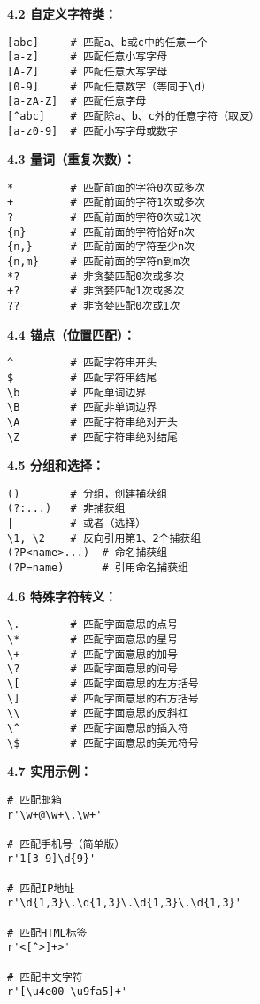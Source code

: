 \begin{mdframed}[linewidth=1pt, linecolor=black]
  \textbf{4.2 自定义字符类：}
  \begin{lstlisting}
[abc]     # 匹配a、b或c中的任意一个
[a-z]     # 匹配任意小写字母
[A-Z]     # 匹配任意大写字母
[0-9]     # 匹配任意数字（等同于\d）
[a-zA-Z]  # 匹配任意字母
[^abc]    # 匹配除a、b、c外的任意字符（取反）
[a-z0-9]  # 匹配小写字母或数字
  \end{lstlisting}

  \textbf{4.3 量词（重复次数）：}
  \begin{lstlisting}
*         # 匹配前面的字符0次或多次
+         # 匹配前面的字符1次或多次
?         # 匹配前面的字符0次或1次
{n}       # 匹配前面的字符恰好n次
{n,}      # 匹配前面的字符至少n次
{n,m}     # 匹配前面的字符n到m次
*?        # 非贪婪匹配0次或多次
+?        # 非贪婪匹配1次或多次
??        # 非贪婪匹配0次或1次
  \end{lstlisting}

  \textbf{4.4 锚点（位置匹配）：}
  \begin{lstlisting}
^         # 匹配字符串开头
$         # 匹配字符串结尾
\b        # 匹配单词边界
\B        # 匹配非单词边界
\A        # 匹配字符串绝对开头
\Z        # 匹配字符串绝对结尾
  \end{lstlisting}

  \textbf{4.5 分组和选择：}
  \begin{lstlisting}
()        # 分组，创建捕获组
(?:...)   # 非捕获组
|         # 或者（选择）
\1, \2    # 反向引用第1、2个捕获组
(?P<name>...)  # 命名捕获组
(?P=name)      # 引用命名捕获组
  \end{lstlisting}

  \textbf{4.6 特殊字符转义：}
  \begin{lstlisting}
\.        # 匹配字面意思的点号
\*        # 匹配字面意思的星号
\+        # 匹配字面意思的加号
\?        # 匹配字面意思的问号
\[        # 匹配字面意思的左方括号
\]        # 匹配字面意思的右方括号
\\        # 匹配字面意思的反斜杠
\^        # 匹配字面意思的插入符
\$        # 匹配字面意思的美元符号
  \end{lstlisting}

  \textbf{4.7 实用示例：}
  \begin{lstlisting}
# 匹配邮箱
r'\w+@\w+\.\w+'

# 匹配手机号（简单版）
r'1[3-9]\d{9}'

# 匹配IP地址
r'\d{1,3}\.\d{1,3}\.\d{1,3}\.\d{1,3}'

# 匹配HTML标签
r'<[^>]+>'

# 匹配中文字符
r'[\u4e00-\u9fa5]+'


\end{lstlisting}
\end{mdframed}
